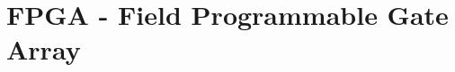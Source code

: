 \documentclass[a3paper, landscape, twocolumn]{article}
\begin{document}
\section*{FPGA - Field Programmable Gate Array}
\lipsum
\nocite{*}

\end{document}
